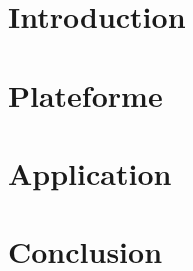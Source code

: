 \documentclass[a4paper, 12pt]{report}
\begin{document}
	


	\tableofcontents	

	\chapter{Introduction}
	
    
	\chapter{Plateforme}
	
    
	\chapter{Application}
	

	\chapter{Conclusion}
	
	
	
\end{document}
